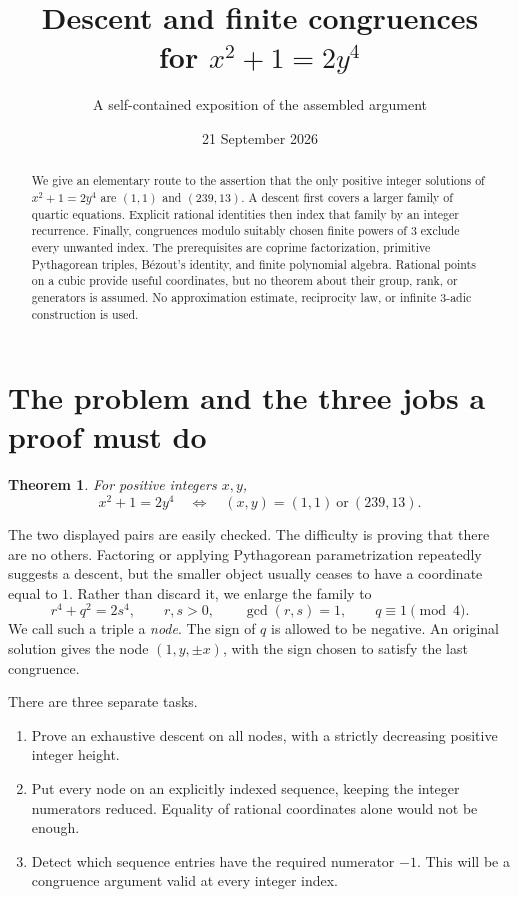 \documentclass[11pt,a4paper]{article}
\title{Descent and finite congruences\protect\\for \(x^2+1=2y^4\)}
\author{A self-contained exposition of the assembled argument}
\date{21 September 2026}
\newtheorem{theorem}{Theorem}[section]
\theoremstyle{definition}
\begin{document}
\maketitle
\begin{abstract}
We give an elementary route to the assertion that the only positive
integer solutions of \(x^2+1=2y^4\) are \((1,1)\) and \((239,13)\).
A descent first covers a larger family of quartic equations. Explicit
rational identities then index that family by an integer recurrence.
Finally, congruences modulo suitably chosen finite powers of \(3\)
exclude every unwanted index. The prerequisites are coprime
factorization, primitive Pythagorean triples, B\'ezout's identity, and
finite polynomial algebra. Rational points on a cubic provide useful
coordinates, but no theorem about their group, rank, or generators is
assumed. No approximation estimate, reciprocity law, or infinite
\(3\)-adic construction is used.
\end{abstract}
\tableofcontents

\section{The problem and the three jobs a proof must do}

\begin{theorem}\label{thm:main}
For positive integers \(x,y\),
\[
 x^2+1=2y^4
 \quad\Longleftrightarrow\quad
 (x,y)=(1,1)\ \text{or}\ (239,13).
\]
\end{theorem}

The two displayed pairs are easily checked. The difficulty is proving
that there are no others. Factoring or applying Pythagorean
parametrization repeatedly suggests a descent, but the smaller object
usually ceases to have a coordinate equal to \(1\). Rather than discard
it, we enlarge the family to
\begin{equation}\label{eq:node}
 r^4+q^2=2s^4,\qquad r,s>0,\qquad \gcd(r,s)=1,
 \qquad q\equiv1\pmod4.
\end{equation}
We call such a triple a \emph{node}. The sign of \(q\) is allowed to be
negative. An original solution gives the node \((1,y,\pm x)\), with
the sign chosen to satisfy the last congruence.

There are three separate tasks.
\begin{enumerate}[label=\arabic*.]
\item Prove an exhaustive descent on all nodes, with a strictly
      decreasing positive integer height.
\item Put every node on an explicitly indexed sequence, keeping the
      integer numerators reduced. Equality of rational coordinates alone
      would not be enough.
\item Detect which sequence entries have the required numerator \(-1\).
      This will be a congruence argument valid at every integer index.
\end{enumerate}
\end{document}
